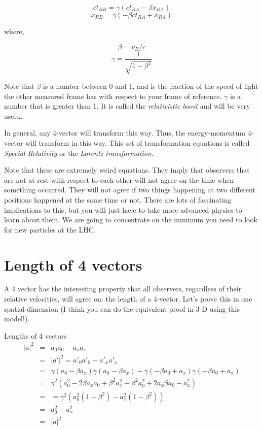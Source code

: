 \begin{equation} ct_{RB} = \gamma(ct_{RA} - \beta x_{RA}) \end{equation} 
\begin{equation}  x_{RB} = \gamma(- \beta ct_{RA} + x_{RA}) 	 \end{equation} 

\noindent where,

\begin{equation} \beta = v_B /c \end{equation}   	
\begin{equation} \gamma = \frac{1}{\sqrt{1- \beta^2}} \end{equation}  


Note that $\beta$  is a number between 0 and 1, and is the fraction of the speed of light the other measured frame has with respect to your frame of reference.  $\gamma$  is a number that is greater than 1.  It is called the {\it relativistic boost} and will be very useful.

In general, any 4-vector will transform this way.  Thus, the energy-momentum 4-vector will transform in this way.  This set of transformation equations is called {\it Special Relativity} or the {\it Lorentz transformation}.

Note that these are extremely weird equations.  They imply that observers that are not at rest with respect to each other will not agree on the time when something occurred. They will not agree if two things happening at two different positions happened at the same time or not.  There are lots of fascinating implications to this, but you will just have to take more advanced physics to learn about them.  We are going to concentrate on the minimum you need to look for new particles at the LHC.

\section{Length of 4 vectors}

A 4 vector has the interesting property that all observers, regardless of their relative velocities, will agree on: the length of a 4-vector.
Let's prove this in one spatial dimension (I think you can do the
equivalent proof in 3-D using this model!). 

Lengths of 4 vectors
\begin{eqnarray}
|a|^2 &=&  a_0 a_0 - a_x a_x  \nonumber \\
      &=&  |a'|^2 = a'_0 a'_0 - a'_x a'_x  \nonumber \\
      &=& \gamma (a_0 -\beta a_x) \gamma (a_0 -\beta a_x) - \gamma (-\beta a_0 +a_x ) \gamma (-\beta a_0 +a_x )  \nonumber \\
      &=&  \gamma^2 (a_0^2  -2 \beta a_x a_0  + \beta^2 a_x^2 - \beta^2 a_0^2  + 2 a_x \beta  a_0  - a_x^2)   \nonumber \\
      &=& =\gamma^2 ( a_0^2 (1-  \beta^2)  - a_x^2 (1-  \beta^2))   \nonumber \\
      &=&  a_0^2 - a_x^2  \nonumber  \\
      &=& |a|^2  
\end{eqnarray} 


